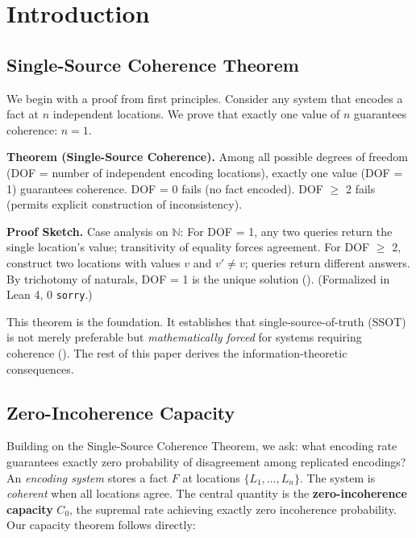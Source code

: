 \section{Introduction}\label{introduction}

\subsection{Single-Source Coherence Theorem}\label{sec:first-principles}

We begin with a proof from first principles. Consider any system that encodes a fact at $n$ independent locations. We prove that exactly one value of $n$ guarantees coherence: $n = 1$.

\textbf{Theorem (Single-Source Coherence).} Among all possible degrees of freedom (DOF = number of independent encoding locations), exactly one value (DOF = 1) guarantees coherence. DOF = 0 fails (no fact encoded). DOF $\geq$ 2 fails (permits explicit construction of inconsistency).

\textbf{Proof Sketch.} Case analysis on $\mathbb{N}$: For DOF = 1, any two queries return the single location's value; transitivity of equality forces agreement. For DOF $\geq$ 2, construct two locations with values $v$ and $v' \neq v$; queries return different answers. By trichotomy of naturals, DOF = 1 is the unique solution (). (Formalized in Lean 4, 0 \texttt{sorry}.)

This theorem is the foundation. It establishes that single-source-of-truth (SSOT) is not merely preferable but \emph{mathematically forced} for systems requiring coherence (). The rest of this paper derives the information-theoretic consequences.

\subsection{Zero-Incoherence Capacity}\label{sec:encoding-problem}

Building on the Single-Source Coherence Theorem, we ask: what encoding rate guarantees exactly zero probability of disagreement among replicated encodings? An \emph{encoding system} stores a fact $F$ at locations $\{L_1,\dots,L_n\}$. The system is \emph{coherent} when all locations agree. The central quantity is the \textbf{zero-incoherence capacity} $C_0$, the supremal rate achieving exactly zero incoherence probability. Our capacity theorem follows directly:

\begin{center}
\end{center}

